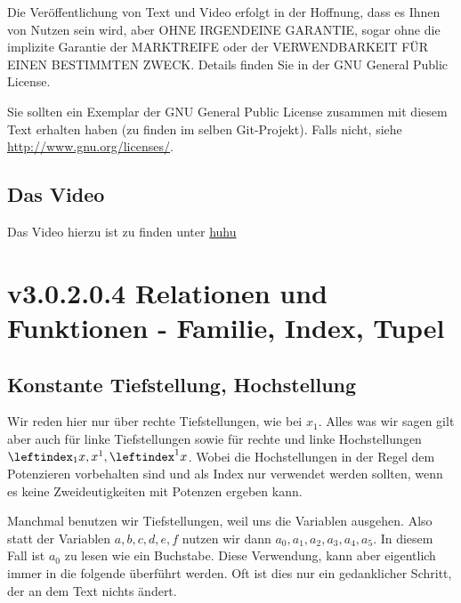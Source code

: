 \documentclass[a4paper]{amsart}
\theoremstyle{definition}
\begin{document}
Die Veröffentlichung von Text und Video erfolgt in der Hoffnung, dass es Ihnen von Nutzen sein wird,
aber OHNE IRGENDEINE GARANTIE, sogar ohne die implizite Garantie der MARKTREIFE oder der
VERWENDBARKEIT FÜR EINEN BESTIMMTEN ZWECK. Details finden Sie in der GNU General Public License.

Sie sollten ein Exemplar der GNU General Public License zusammen mit diesem Text erhalten haben
(zu finden im selben Git-Projekt).
Falls nicht, siehe \url{http://www.gnu.org/licenses/}.

\subsection*{Das Video}
Das Video hierzu ist zu finden unter
{\tiny
   \url{huhu}
}

\section{v3.0.2.0.4 Relationen und Funktionen - Familie, Index, Tupel}

\subsection{Konstante Tiefstellung, Hochstellung}
Wir reden hier nur über rechte Tiefstellungen, wie bei $x_1$. Alles was wir sagen gilt aber auch für linke Tiefstellungen sowie für rechte und linke Hochstellungen $\leftindex_{1}{x}, x^1, \leftindex^{1}{x}$. Wobei die Hochstellungen in der Regel dem Potenzieren vorbehalten sind und als Index nur verwendet werden sollten, wenn es keine Zweideutigkeiten mit Potenzen ergeben kann.

Manchmal benutzen wir Tiefstellungen, weil uns die Variablen ausgehen. Also statt der Variablen $a,b,c,d,e,f$ nutzen wir dann $a_0,a_1,a_2,a_3,a_4,a_5$. In diesem Fall ist $a_0$ zu lesen wie ein Buchstabe. Diese Verwendung, kann aber eigentlich immer in die folgende überführt werden. Oft ist dies nur ein gedanklicher Schritt, der an dem Text nichts ändert.
\end{document}
